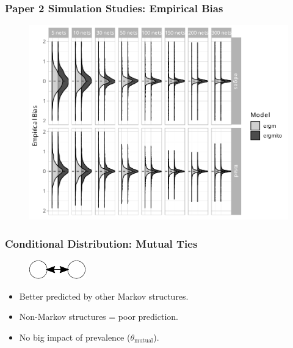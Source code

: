 \documentclass[aspectratio=169, 9pt, handout]{beamer}
\begin{document}
\begin{frame}[label=ergmito-bias]
\frametitle{Paper 2 Simulation Studies: Empirical Bias}

\begin{figure}
\centering
\includegraphics[width=.6\linewidth]{bias-02-various-sizes-4-5-ttriad.pdf}
\end{figure}


\end{frame}

\begin{frame}[c,label=conditional-mutuals]
	\frametitle{Conditional Distribution: Mutual Ties}
	\begin{minipage}[b]{.28\linewidth}
		\begin{figure}
			\includegraphics[width=.3\linewidth]{mutual.pdf}
		\end{figure}
		
		\begin{itemize}[<+->]
			\item Better predicted by other Markov structures.
			\item Non-Markov structures = poor prediction.
			\item No big impact of prevalence ($\theta_{\mbox{mutual}}$).
		\end{itemize}
	\end{minipage}
	\begin{minipage}[b]{.7\linewidth}
		\begin{figure}
			\centering
			\def\svgwidth{.95\linewidth}
		\end{figure}
	\end{minipage}
	\vfill\hfill
	\hyperlink{conditional-transitivity}{}
\end{frame}
\end{document}
